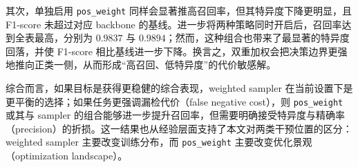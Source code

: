 其次，单独启用 \texttt{pos\_weight} 同样会显著推高召回率，但其特异度下降更明显，且 F1-score 未超过对应 backbone 的基线。进一步将两种策略同时开启后，召回率达到全表最高，分别为 $0.9837$ 与 $0.9894$；然而，这种组合也带来了最显著的特异度回落，并使 F1-score 相比基线进一步下降。换言之，双重加权会把决策边界更强地推向正类一侧，从而形成“高召回、低特异度”的代价敏感解。

综合而言，如果目标是获得更稳健的综合表现，weighted sampler 在当前设置下是更平衡的选择；如果任务更强调漏检代价（false negative cost），则 \texttt{pos\_weight} 或其与 sampler 的组合能够进一步提升召回率，但需要明确接受特异度与精确率（precision）的折损。这一结果也从经验层面支持了本文对两类干预位置的区分：weighted sampler 主要改变训练分布，而 \texttt{pos\_weight} 主要改变优化景观（optimization landscape）。
